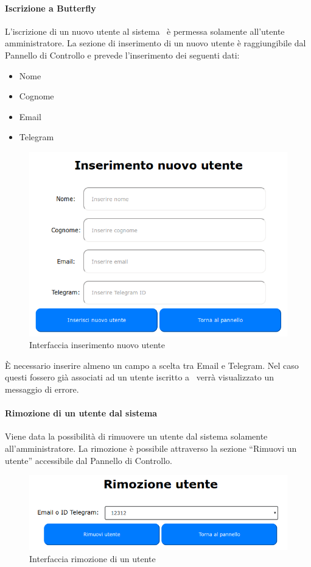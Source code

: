 \paragraph{Iscrizione a Butterfly}\label{Iscrizione}
L'iscrizione di un nuovo utente al sistema \progetto\ è permessa solamente all'utente amministratore.
La sezione di inserimento di un nuovo utente è raggiungibile dal Pannello di Controllo e prevede l'inserimento dei seguenti dati:
\begin{itemize}
	\item Nome
	\item Cognome
	\item Email
	\item Telegram
\end{itemize}
\begin{figure}[H]
	\centering
	\includegraphics[width=13cm]{img/inserimento_1.png}
	\caption{Interfaccia inserimento nuovo utente}
\end{figure}

È necessario inserire almeno un campo a scelta tra Email e Telegram.
Nel caso questi fossero già associati ad un utente iscritto a \progetto\ verrà visualizzato un messaggio di errore.

\paragraph{Rimozione di un utente dal sistema}\label{Rimozione}
Viene data la possibilità di rimuovere un utente dal sistema solamente all'amministratore.
La rimozione è possibile attraverso la sezione ``Rimuovi un utente'' accessibile dal Pannello di Controllo.
\begin{figure}[H]
	\centering
	\includegraphics[width=12cm]{img/rimozione_1.png}
	\caption{Interfaccia rimozione di un utente}
\end{figure}

